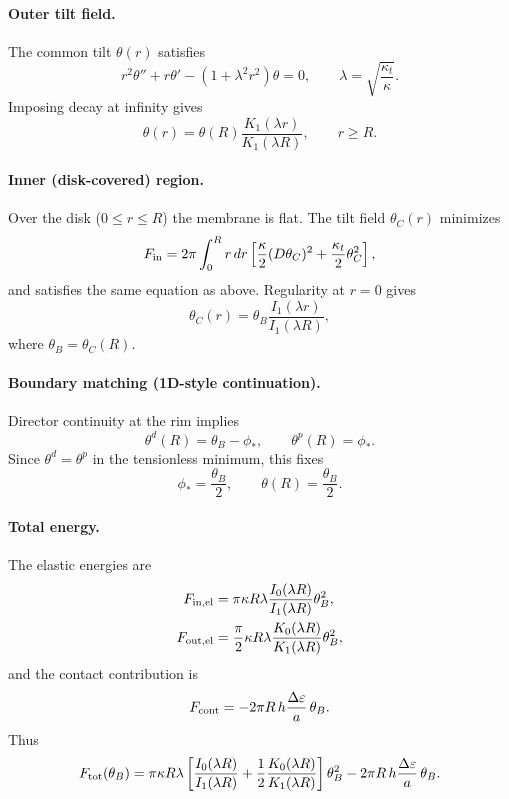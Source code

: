 \documentclass[11pt]{article}
\begin{document}
\paragraph{Outer tilt field.}
The common tilt \(\theta(r)\) satisfies
\begin{equation}
r^2\theta''+r\theta'-(1+\lambda^2 r^2)\theta=0,
\qquad
\lambda=\sqrt{\frac{\kappa_t}{\kappa}}.
\end{equation}
Imposing decay at infinity gives
\begin{equation}
\theta(r)=\theta(R)\frac{K_1(\lambda r)}{K_1(\lambda R)},
\qquad r\ge R.
\end{equation}

\paragraph{Inner (disk-covered) region.}
Over the disk (\(0\le r\le R\)) the membrane is flat.
The tilt field \(\theta_C(r)\) minimizes
\begin{equation}
F_{\rm in}
=
2\pi\int_0^R r\,dr
\left[
\frac{\kappa}{2}(D\theta_C)^2
+\frac{\kappa_t}{2}\theta_C^2
\right],
\end{equation}
and satisfies the same equation as above.
Regularity at \(r=0\) gives
\begin{equation}
\theta_C(r)=\theta_B\frac{I_1(\lambda r)}{I_1(\lambda R)},
\end{equation}
where \(\theta_B=\theta_C(R)\).

\paragraph{Boundary matching (1D-style continuation).}
Director continuity at the rim implies
\begin{equation}
\theta^d(R)=\theta_B-\phi_*,
\qquad
\theta^p(R)=\phi_*.
\end{equation}
Since \(\theta^d=\theta^p\) in the tensionless minimum, this fixes
\begin{equation}
\phi_*=\frac{\theta_B}{2},
\qquad
\theta(R)=\frac{\theta_B}{2}.
\end{equation}

\paragraph{Total energy.}
The elastic energies are
\begin{align}
F_{\rm in,el}
&=
\pi\kappa R\lambda
\frac{I_0(\lambda R)}{I_1(\lambda R)}\theta_B^2,\\
F_{\rm out,el}
&=
\frac{\pi}{2}\kappa R\lambda
\frac{K_0(\lambda R)}{K_1(\lambda R)}\theta_B^2,
\end{align}
and the contact contribution is
\begin{equation}
F_{\rm cont}=-2\pi R\,h\frac{\Delta\varepsilon}{a}\,\theta_B.
\end{equation}
Thus
\begin{equation}
F_{\rm tot}(\theta_B)
=
\pi\kappa R\lambda
\left[
\frac{I_0(\lambda R)}{I_1(\lambda R)}
+\frac{1}{2}\frac{K_0(\lambda R)}{K_1(\lambda R)}
\right]\theta_B^2
-2\pi R\,h\frac{\Delta\varepsilon}{a}\,\theta_B.
\end{equation}
\end{document}
